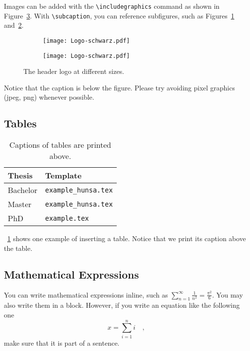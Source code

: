 Images can be added with the \verb|\includegraphics| command as shown
in Figure~\ref{fig:intro}.  With \verb|\subcaption|, you can reference
subfigures, such as Figures~\ref{fig:intro:full width}
and~\ref{fig:intro:half width}.
%
\begin{figure}[h]
  \centering
  \begin{subfigure}[b]{0.45\columnwidth}
    \centering
    \texttt{[image: Logo-schwarz.pdf]}
    \label{fig:intro:full width}
  \end{subfigure}
  \begin{subfigure}[b]{0.45\columnwidth}
    \centering
    \texttt{[image: Logo-schwarz.pdf]}
    \label{fig:intro:half width}
  \end{subfigure}
  \caption[Short caption for TOC]{The header logo at different sizes.} 
  \label{fig:intro} 
\end{figure}
%

Notice that the caption is below the figure. Please try avoiding pixel
graphics (jpeg, png) whenever possible.

\subsection{Tables}

\begin{table}[t]
  \centering
  \caption{Captions of tables are printed above.}
  \label{tab:example1}
  \begin{tabular}{ll}
    \toprule
    Thesis  & Template    \\
    \midrule
    Bachelor & \verb|example_hunsa.tex| \\
    Master  & \verb|example_hunsa.tex| \\
    PhD & \verb|example.tex| \\
    \bottomrule
  \end{tabular}
\end{table}

\tab~\ref{tab:example1} shows one example of inserting a table. Notice
that we print its caption above the table.


\subsection{Mathematical Expressions}

You can write mathematical expressions inline, such as
$\sum_{n=1}^{\infty} \frac{1}{n^2} = \frac{\pi^2}{6}$.
You may also write them in a block.
However, if you write an equation like the following one
\begin{equation*}
x = \sum_{i=1}^{n} i \quad ,
\end{equation*}
make sure that it is part of a sentence.

